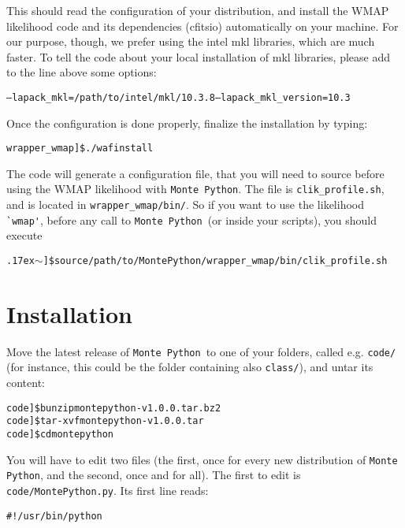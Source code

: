 \documentclass[10pt]{article}
\newcommand{\MP}{\texttt{Monte Python}}
\newcommand{\tild}{\raise.17ex\hbox{$\scriptstyle\mathtt{\sim}$}}
\begin{document}
  This should read the configuration of your distribution, and install the WMAP likelihood code and its
  dependencies (cfitsio) automatically on your machine. For our purpose,
  though, we prefer using the intel mkl libraries, which are much faster. To
  tell the code about your local installation of mkl libraries, please add to the line above some options:
  \begin{alltt}
     --lapack_mkl=/path/to/intel/mkl/10.3.8 --lapack_mkl_version=10.3
  \end{alltt}

  Once the configuration is done properly, finalize the installation by typing:
  
  \begin{alltt}
    wrapper_wmap]\$ ./waf install
  \end{alltt}

  The code will generate a configuration file, that you will need to source
  before using the WMAP likelihood with \MP. The file is \verb?clik_profile.sh?, and is located
  in \verb?wrapper_wmap/bin/?. So if you want to use the likelihood \verb?`wmap'?, before any call to \MP~(or inside your
  scripts), you should execute

  \begin{alltt}
    \tild]\$ source /path/to/MontePython/wrapper_wmap/bin/clik_profile.sh
  \end{alltt}

\newpage
\section{Installation\label{sec:installation}}

  Move the latest release of \MP~to one of your folders, called e.g. \verb?code/? (for instance, this could be the folder containing also \verb?class/?), and untar its
  content:

  \begin{alltt} 
    code]\$ bunzip montepython-v1.0.0.tar.bz2 
    code]\$ tar -xvf montepython-v1.0.0.tar
    code]\$ cd montepython
  \end{alltt}

 You will have to edit two files (the first, once for every new distribution of \MP, and
 the second, once and for all). The first to edit is
 \verb?code/MontePython.py?. Its first line reads:

 \begin{alltt}
    #!/usr/bin/python
 \end{alltt}
\end{document}
